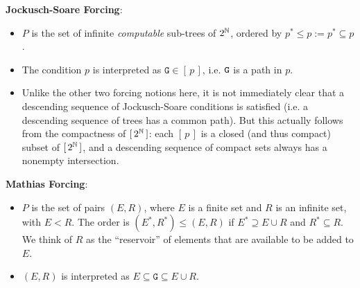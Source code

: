 \documentclass{amsart}
\begin{document}
	\textbf{Jockusch-Soare Forcing}: 
	\begin{itemize} 
		\item $P$ is the set of infinite \textit{computable} sub-trees of $2^{\mathbb{N}}$, ordered by $p^*\leq p := p^*\subseteq p$.
		\item The condition $p$ is interpreted as $\mathtt{G}\in [\, p \,]$, i.e. $\tt{G}$ is a path in $p$.
		\item Unlike the other two forcing notions here, it is not immediately clear that a descending sequence of Jockusch-Soare conditions is satisfied (i.e. a descending sequence of trees has a common path). But this actually follows from the compactness of $[\, 2^{\mathbb{N}}\,]$: each $[\,p\,]$ is a closed (and thus compact) subset of $[\,2^{\mathbb{N}}\,]$, and a descending sequence of compact sets always has a nonempty intersection. 
	\end{itemize}
	
	\textbf{Mathias Forcing}: 
	\begin{itemize}
		\item $P$ is the set of pairs $(E,R)$, where $E$ is a finite set and $R$ is an infinite set, with $E<R$. The order is $(E^*,R^*)\leq (E,R)$ if $E^*\supseteq E\cup R$ and $R^*\subseteq R$. We think of $R$ as the ``reservoir'' of elements that are available to be added to $E$.
		\item $(E,R)$ is interpreted as $E\subseteq  \mathtt{G}\subseteq E\cup R$.
	\end{itemize} 
	
\end{document}
